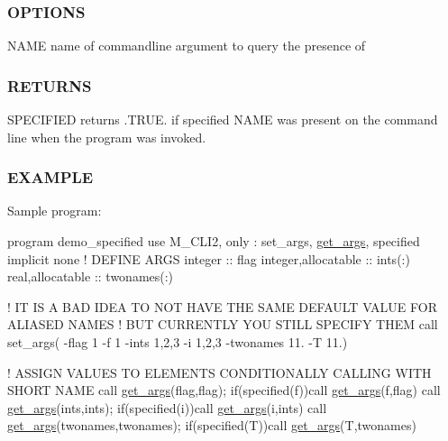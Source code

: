 \subsubsection*{O\+P\+T\+I\+O\+NS}

\begin{DoxyVerb}NAME   name of commandline argument to query the presence of
\end{DoxyVerb}


\subsubsection*{R\+E\+T\+U\+R\+NS}

S\+P\+E\+C\+I\+F\+I\+ED returns .T\+R\+UE. if specified N\+A\+ME was present on the command line when the program was invoked.

\subsubsection*{E\+X\+A\+M\+P\+LE}

Sample program\+:

program demo\+\_\+specified use M\+\_\+\+C\+L\+I2, only \+: set\+\_\+args, \mbox{\hyperlink{interfacem__cli2_1_1get__args}{get\+\_\+args}}, specified implicit none ! D\+E\+F\+I\+NE A\+R\+GS integer \+:\+: flag integer,allocatable \+:\+: ints(\+:) real,allocatable \+:\+: twonames(\+:)

! IT IS A B\+AD I\+D\+EA TO N\+OT H\+A\+VE T\+HE S\+A\+ME D\+E\+F\+A\+U\+LT V\+A\+L\+UE F\+OR A\+L\+I\+A\+S\+ED N\+A\+M\+ES ! B\+UT C\+U\+R\+R\+E\+N\+T\+LY Y\+OU S\+T\+I\+LL S\+P\+E\+C\+I\+FY T\+H\+EM call set\+\_\+args(\textquotesingle{} -\/flag 1 -\/f 1 -\/ints 1,2,3 -\/i 1,2,3 -\/twonames 11. -\/T 11.\textquotesingle{})

! A\+S\+S\+I\+GN V\+A\+L\+U\+ES TO E\+L\+E\+M\+E\+N\+TS C\+O\+N\+D\+I\+T\+I\+O\+N\+A\+L\+LY C\+A\+L\+L\+I\+NG W\+I\+TH S\+H\+O\+RT N\+A\+ME call \mbox{\hyperlink{interfacem__cli2_1_1get__args}{get\+\_\+args}}(\textquotesingle{}flag\textquotesingle{},flag); if(specified(\textquotesingle{}f\textquotesingle{}))call \mbox{\hyperlink{interfacem__cli2_1_1get__args}{get\+\_\+args}}(\textquotesingle{}f\textquotesingle{},flag) call \mbox{\hyperlink{interfacem__cli2_1_1get__args}{get\+\_\+args}}(\textquotesingle{}ints\textquotesingle{},ints); if(specified(\textquotesingle{}i\textquotesingle{}))call \mbox{\hyperlink{interfacem__cli2_1_1get__args}{get\+\_\+args}}(\textquotesingle{}i\textquotesingle{},ints) call \mbox{\hyperlink{interfacem__cli2_1_1get__args}{get\+\_\+args}}(\textquotesingle{}twonames\textquotesingle{},twonames); if(specified(\textquotesingle{}T\textquotesingle{}))call \mbox{\hyperlink{interfacem__cli2_1_1get__args}{get\+\_\+args}}(\textquotesingle{}T\textquotesingle{},twonames)

